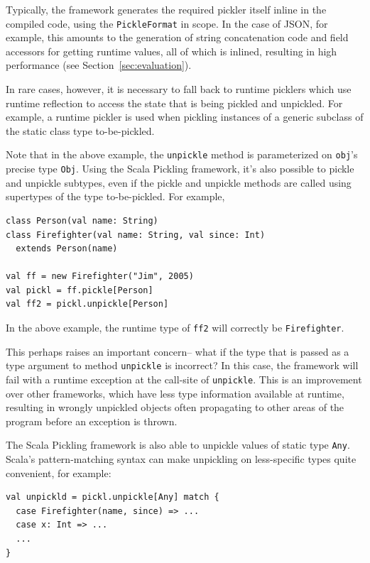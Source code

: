 \documentclass[preprint,10pt]{sigplanconf}
\theoremstyle{definition}
\theoremstyle{definition}
\newcommand{\term}[1]{\mbox{\texttt{#1}}}
\begin{document}
Typically, the framework generates the required pickler itself inline in the
compiled code, using the \term{PickleFormat} in scope. In the case of JSON,
for example, this amounts to the generation of string concatenation code and
field accessors for getting runtime values, all of which is inlined, resulting
in high performance (see Section~\ref{sec:evaluation}).

In rare cases, however, it is necessary to fall back to runtime picklers which
use runtime reflection to access the state that is being pickled and
unpickled. For example, a runtime pickler is used when pickling instances of a
generic subclass of the static class type to-be-pickled.

Note that in the above example, the \term{unpickle} method is parameterized on
\term{obj}'s precise type \term{Obj}. Using the Scala Pickling framework, it's
also possible to pickle and unpickle subtypes, even if the pickle and unpickle
methods are called using supertypes of the type to-be-pickled.
For example,

\begin{lstlisting}
class Person(val name: String)
class Firefighter(val name: String, val since: Int)
  extends Person(name)

val ff = new Firefighter("Jim", 2005)
val pickl = ff.pickle[Person]
val ff2 = pickl.unpickle[Person]
\end{lstlisting}

In the above example, the runtime type of \term{ff2} will correctly be
\term{Firefighter}.

This perhaps raises an important concern-- what if the type that is passed as
a type argument to method \term{unpickle} is incorrect? In this case, the
framework will fail with a runtime exception at the call-site of
\term{unpickle}. This is an improvement over other frameworks, which have less
type information available at runtime, resulting in wrongly unpickled objects
often propagating to other areas of the program before an exception is thrown.

The Scala Pickling framework is also able to unpickle values of static type
\term{Any}. Scala's pattern-matching syntax can make unpickling on less-specific
types quite convenient, for example:

\begin{lstlisting}
val unpickld = pickl.unpickle[Any] match {
  case Firefighter(name, since) => ...
  case x: Int => ...
  ...
}
\end{lstlisting}
\end{document}
